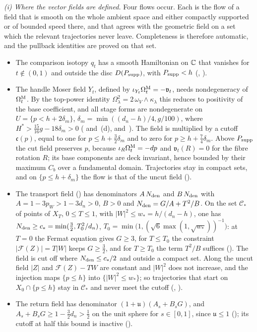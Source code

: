 \emph{(i) Where the vector fields are defined.} Four flows occur. Each is the flow of a field that is smooth on the
whole ambient space and either compactly supported or of bounded speed there, and that agrees with the geometric field
on a set which the relevant trajectories never leave. Completeness is therefore automatic, and the pullback identities
are proved on that set.
\begin{itemize}
\item The comparison isotopy $q_t$ has a smooth Hamiltonian on $\mathbb{C}$ that vanishes for $t\notin(0,1)$ and outside the
disc $D(P_{\rm supp})$, with $P_{\rm supp}<h$ (, ).
\item The handle Moser field $Y_t$, defined by $\iota_{Y_t}\Omega^{\rm M}_t=-\mathfrak v_t$, needs nondegeneracy of
$\Omega^{\rm M}_t$. By the top-power identity $\Omega_\lambda^2=2\,\omega_V\wedge\kappa_\lambda$ this reduces to positivity
of the base coefficient, and all stage forms are nondegenerate on $U=\{p<h+2\delta_m\}$,
$\delta_m=\min((d_n-h)/4,g/100)$, where $H^*>\frac{15}{16}g-18\delta_m>0$ (
and~(d),  and~). The field is multiplied by a
cutoff $\mathfrak c(p)$, equal to one for $p\le h+\frac32\delta_m$ and to zero for $p\ge h+\frac74\delta_m$. Above
$P_{\rm supp}$ the cut field preserves $p$, because $\iota_R\Omega^{\rm M}_t=-dp$ and $\mathfrak v_t(R)=0$ for the fibre
rotation $R$; its base components are deck invariant, hence bounded by their maximum $C_b$ over a fundamental domain.
Trajectories stay in compact sets, and on $\{p\le h+\delta_m\}$ the flow is that of the uncut field
().
\item The transport field () has denominators $A\,N_{\rm den}$ and $B\,N_{\rm den}$ with
$A=1-3p_W>1-3d_n>0$, $B>0$ and $N_{\rm den}=G/A+T^2/B$. On the set $\mathcal C_*$ of points of $X_T$, $0\le T\le1$, with
$|W|^2\le w_*=h/(d_n-h)$, one has $N_{\rm den}\ge c_*=\min(\frac32,T_0^2/d_n)$,
$T_0=\min\bigl(1,(\sqrt6\max(1,\sqrt{w_*}))^{-1}\bigr)$: at $T=0$ the Fermat equation gives $G\ge3$, for $T\le T_0$ the
constraint $|\mathcal F(Z)|=T|W|$ keeps $G\ge\frac32$, and for $T\ge T_0$ the term $T^2/B$ suffices
(). The field is cut off where $N_{\rm den}\le c_*/2$ and outside a compact set. Along
the uncut field $|Z|$ and $\mathcal F(Z)-TW$ are constant and $|W|^2$ does not increase, and the injection maps
$\{p\le h\}$ into $\{|W|^2\le w_*\}$; so trajectories that start on $X_0\cap\{p\le h\}$ stay in $\mathcal C_*$ and never
meet the cutoff (, ).
\item The return field has denominator $(1+\mathfrak u)(A_s+B_sG)$, and $A_s+B_sG\ge1-\frac32d_n>\frac12$ on the unit
sphere for $s\in[0,1]$, since $\mathfrak u\le1$ (); its cutoff at half this bound is
inactive ().
\end{itemize}
